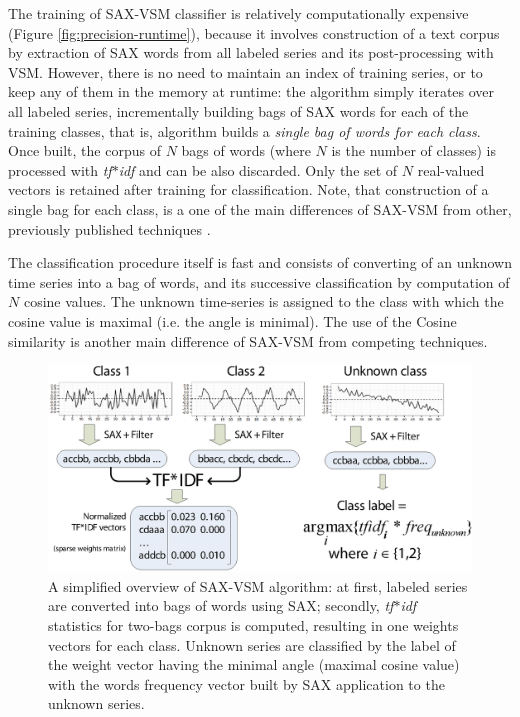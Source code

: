 \documentclass{llncs}
\begin{document}
The training of SAX-VSM classifier is relatively computationally expensive (Figure
\ref{fig:precision-runtime}), because it involves construction of a text corpus by extraction 
of SAX words from all labeled series and its post-processing with VSM. However, there is no need 
to maintain an index of training series, or to keep any of them in the memory at runtime:
the algorithm simply iterates over all labeled series, incrementally building bags of SAX words for
each of the training classes, that is, algorithm builds a \textit{single bag of words for each
class}. Once built, the corpus of $N$ bags of words (where $N$ is the number of classes) is
processed with \textit{tf$\ast$idf} and can be also discarded. Only the set of $N$ real-valued
vectors is retained after training for classification. Note, that construction of a single bag for
each class, is a one of the main differences of SAX-VSM from other, previously published 
techniques \cite{bag_patterns}.

The classification procedure itself is fast and consists of converting of an unknown time series
into a bag of words, and its successive classification by computation of $N$ cosine values. The
unknown time-series is assigned to the class with which the cosine value is maximal (i.e. the
angle is minimal). The use of the Cosine similarity is another main difference of SAX-VSM from
competing techniques.

\begin{figure}[t]
   \centering
   \includegraphics[width=115mm]{figures/overview.eps}
   \caption{A simplified overview of SAX-VSM algorithm: at first, labeled series are converted into
bags of words using SAX; 
secondly, \textit{tf$\ast$idf} statistics for two-bags corpus is computed, resulting in one weights
vectors for each class.
Unknown series are classified by the label of the weight vector having the minimal angle (maximal
cosine value) with the words frequency vector built by SAX application to the unknown series.}
   \label{fig:overview}
\end{figure}
\end{document}
